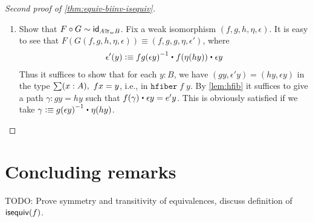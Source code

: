 \begin{proof}[Second proof of \autoref{thm:equiv-biinv-isequiv}]
\begin{enumerate}
\item Show that $F \circ G \sim \idfunc[A \cong_w B]$. Fix a weak isomorphism $(f,g,h,\eta,\epsilon)$. It is easy to see that $F(G(f,g,h,\eta,\epsilon)) \equiv (f,g,g,\eta,\epsilon')$, where
\begin{align*}
\epsilon'(y) \defeq \opp{fg(\epsilon y)} \ct f(\eta (h y)) \ct \epsilon y
\end{align*}
Thus it suffices to show that for each $y : B$, we have $(g y, \epsilon' y) = (h y, \epsilon y)$ in the type $\sm{x : A} f x = y$, i.e., in $\mathtt{hfiber \;} f \; y$. By  \autoref{lem:hfib} it suffices to give a path $\gamma : gy = hy$ such that $f(\gamma) \ct \epsilon y = e' y$. This is obviously satisfied if we take  $\gamma \defeq \opp{g(\epsilon y)} \ct \eta(h y)$.\qedhere
\end{enumerate}

\end{proof}

\section{Concluding remarks}
\label{sec:concluding-remarks}

TODO: Prove symmetry and transitivity of equivalences, discuss definition of $\isequiv(f)$.




